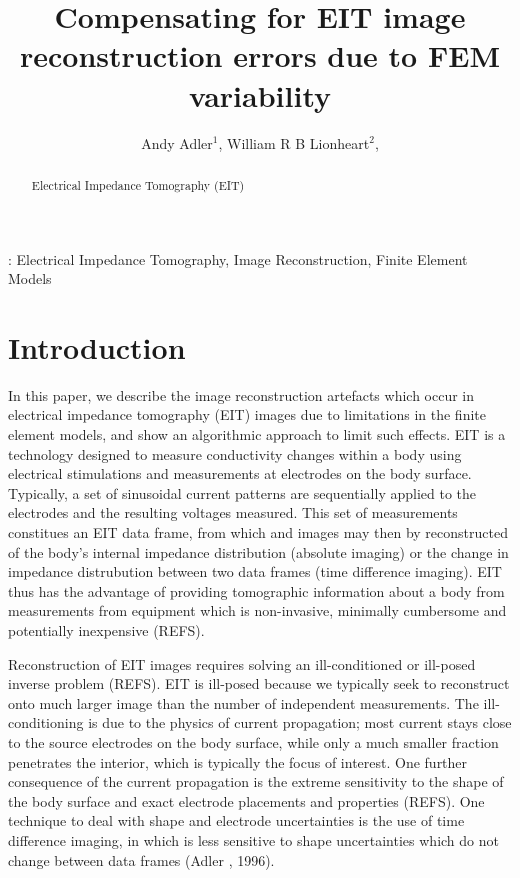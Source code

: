 \documentclass[12pt,draft]{iopart}
\begin{document}
\title[FEM variability and EIT images]{%
 Compensating for EIT image reconstruction errors due to 
   FEM variability 
}

\author{Andy Adler$^{1}$,
        William R B Lionheart$^{2}$,
       }

\address{ $^{1}$Systems and Computer Engineering,
                Carleton University, Ottawa, Canada}
\address{$^{13}$School of Mathematics, University of Manchester, UK}



\begin{abstract}
Electrical Impedance Tomography (EIT)
\end{abstract}

:
Electrical Impedance Tomography,
Image Reconstruction,
Finite Element Models

\section{Introduction}
In this paper, we describe the image reconstruction artefacts
which occur in electrical impedance tomography (EIT) images
due to limitations in the finite element models, and show
an algorithmic approach to limit such effects.
%
EIT is a technology designed to measure conductivity
changes within a body using electrical stimulations and
measurements at electrodes on the body surface. Typically,
a set of sinusoidal current patterns are sequentially applied to
the electrodes and the resulting voltages measured. This
set of measurements constitues an EIT data frame, from which
and images may then by reconstructed of the body's internal impedance
distribution (absolute imaging) or the change in impedance distrubution
between two data frames (time difference imaging). EIT thus has
the advantage of providing tomographic information about a body
from measurements from equipment which is non-invasive, minimally
cumbersome and potentially inexpensive (REFS).
 
Reconstruction of EIT images requires solving an ill-conditioned
or ill-posed inverse problem (REFS).
 EIT is ill-posed because we typically
seek to reconstruct onto much larger image than the number of
independent measurements.
 The ill-conditioning is
due to the physics of current propagation; most current stays
close to the source electrodes on the body surface, while only
a much smaller fraction penetrates the interior, which is typically
the focus of interest.
One further consequence of the current propagation is the extreme
sensitivity to the shape of the body surface and exact electrode
placements and properties (REFS). One technique to deal with
shape and electrode uncertainties is the use of time difference
imaging, in which is less sensitive to shape uncertainties which do
not change between data frames (Adler \etal, 1996).
\end{document}
